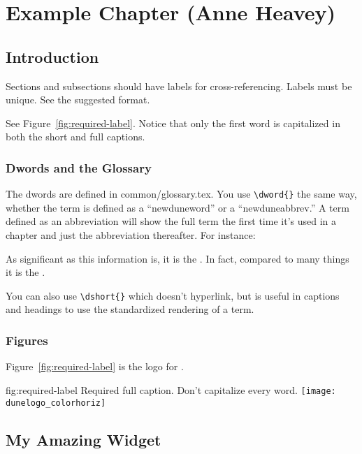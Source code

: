 \chapter{Example Chapter (Anne Heavey)}
\label{ch:chap-id}

\section{Introduction}
\label{sec:chap-id:intro}

Sections and subsections should have labels for cross-referencing. Labels must be unique. See the suggested format.

See Figure~\ref{fig:required-label}. Notice that only the first word is capitalized in both the short and full captions.  

\subsection{Dwords and the Glossary}
\label{sec:chap-id:intro}

The dwords are defined in common/glossary.tex. You use \verb|\dword{}| the same way, whether the term is defined as a ``newduneword'' or a ``newduneabbrev.''  A term defined as an abbreviation will show the full term the first time it's used in a chapter and just the abbreviation thereafter.  For instance:

As significant as this information is, it is the . In fact, compared to many things it is the .

You can also use \verb|\dshort{}| which doesn't hyperlink, but is useful in captions and headings to use the standardized rendering of a term.

\subsection{Figures}
\label{sec:chap-id:intro}


Figure~\ref{fig:required-label} is the logo for . 

\begin{dunefigure}
{fig:required-label}
{Required full caption. Don't capitalize every word.}
\texttt{[image: dunelogo\_colorhoriz]}
\end{dunefigure}

\section{My Amazing Widget}
\label{sec:chap-id:mywidget}

